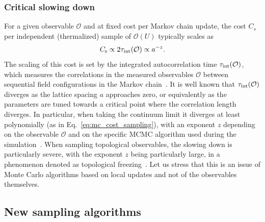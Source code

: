 \documentclass[12pt]{article}
\begin{document}
\subsubsection{Critical slowing down}


For a given observable $\mathcal{O}$ and at fixed cost per Markov chain update, the cost $C_s$ per independent (thermalized) sample of $\mathcal{O}(U)$ typically scales as
\begin{equation}
\label{eq:mc_cost_sampling}
C_{\rm s} \propto 2\tau_{\rm int} (\mathcal{O}) \propto a^{-z}.
\end{equation}
The scaling of this cost is set by the integrated autocorrelation time $\tau_{\rm int} (\mathcal{O})$,
which measures the correlations in the measured observables $\mathcal{O}$ between sequential field configurations in the Markov chain~\cite{Wolff:2003sm}. %
It is well known that $\tau_{\rm int} (\mathcal{O})$ diverges as the lattice spacing $a$ approaches zero, or equivalently as the parameters are tuned towards a critical point where the correlation length diverges. In particular, when taking the continuum limit it diverges at least polynomially (as in Eq.~\eqref{eq:mc_cost_sampling}), with an exponent $z$ depending on the observable $\mathcal{O}$ and on the specific MCMC algorithm used during the simulation~\cite{Wolff:1989wq}. When sampling topological observables, the slowing down is particularly severe, with the exponent $z$ being particularly large, in a phenomenon denoted as topological freezing~\cite{DelDebbio:2004xh, Schaefer:2010hu, Hasenbusch:2017unr, Bonanno:2020hht, Eichhorn:2023uge}. Let us stress that this is an issue of Monte Carlo algorithms based on local updates and not of the observables themselves. 

\subsection{New sampling algorithms}
\label{sec:alternative_sampling}
\end{document}
